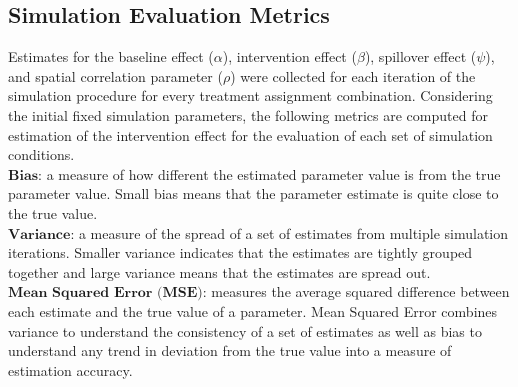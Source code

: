 \documentclass{article}[11pt]
\begin{document}
\subsection{Simulation Evaluation Metrics}

Estimates for the baseline effect ($\alpha$), intervention effect ($\beta$), spillover effect ($\psi$), and spatial correlation parameter ($\rho$) were collected for each iteration of the simulation procedure for every treatment assignment combination. Considering the initial fixed simulation parameters, the following metrics are computed for estimation of the intervention effect for the evaluation of each set of simulation conditions.\\


\noindent $\textbf{Bias}$: a measure of how different the estimated parameter value is from the true parameter value. Small bias means that the parameter estimate is quite close to the true value.\\

\noindent $\textbf{Variance}$: a measure of the spread of a set of estimates from multiple simulation iterations. Smaller variance indicates that the estimates are tightly grouped together and large variance means that the estimates are spread out.\\

\noindent $\textbf{Mean Squared Error (MSE)}$: measures the average squared difference between each estimate and the true value of a parameter. Mean Squared Error combines variance to understand the consistency of a set of estimates as well as bias to understand any trend in deviation from the true value into a measure of estimation accuracy.\\
\end{document}
